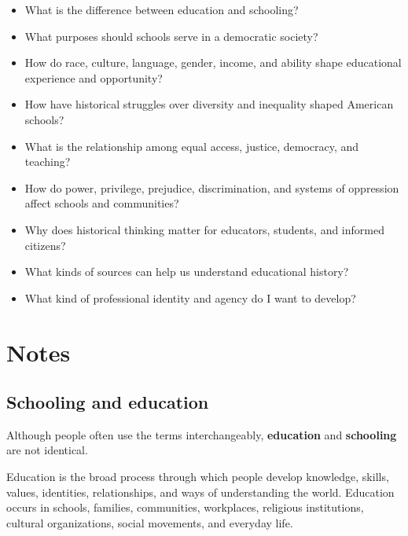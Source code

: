\documentclass[
  letterpaper,
  DIV=11,
  numbers=noendperiod]{scrartcl}
\providecommand{\tightlist}{%
  \setlength{\itemsep}{0pt}\setlength{\parskip}{0pt}}\usepackage{longtable,booktabs,array}
\begin{document}
\begin{itemize}
\tightlist
\item
  What is the difference between education and schooling?
\item
  What purposes should schools serve in a democratic society?
\item
  How do race, culture, language, gender, income, and ability shape
  educational experience and opportunity?
\item
  How have historical struggles over diversity and inequality shaped
  American schools?
\item
  What is the relationship among equal access, justice, democracy, and
  teaching?
\item
  How do power, privilege, prejudice, discrimination, and systems of
  oppression affect schools and communities?
\item
  Why does historical thinking matter for educators, students, and
  informed citizens?
\item
  What kinds of sources can help us understand educational history?
\item
  What kind of professional identity and agency do I want to develop?
\end{itemize}

\section{Notes}\label{notes}

\subsection{Schooling and education}\label{schooling-and-education}

Although people often use the terms interchangeably, \textbf{education}
and \textbf{schooling} are not identical.

\begin{tcolorbox}[enhanced jigsaw, colframe=quarto-callout-note-color-frame, rightrule=.15mm, opacitybacktitle=0.6, leftrule=.75mm, colback=white, breakable, coltitle=black, arc=.35mm, bottomrule=.15mm, titlerule=0mm, left=2mm, colbacktitle=quarto-callout-note-color!10!white, title=\textcolor{quarto-callout-note-color}{\faInfo}\hspace{0.5em}{Education}, toprule=.15mm, bottomtitle=1mm, toptitle=1mm, opacityback=0]

Education is the broad process through which people develop knowledge,
skills, values, identities, relationships, and ways of understanding the
world. Education occurs in schools, families, communities, workplaces,
religious institutions, cultural organizations, social movements, and
everyday life.

\end{tcolorbox}
\end{document}
